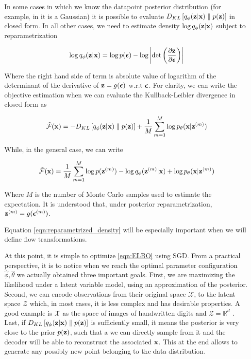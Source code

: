 \documentclass[12pt]{article}
\begin{document}
In some cases in which we know the datapoint posterior distribution (for example, in \cite{kingma2022autoencoding} it is a Gaussian) it is possible to evaluate \(D_{KL}\left[ q_{\phi}(\textbf{z}|\textbf{x}) \parallel p(\textbf{z}) \right]\) in closed form. In all other cases, we need to estimate density \(\log q_\phi (\textbf{z}|\textbf{x})\) subject to reparametrization

\begin{equation}
    \label{eqn:reparametrized_density}
    \log q_\phi (\textbf{z}|\textbf{x}) = \log p(\bm{\epsilon}) - \log \left| \det \left( \frac{\partial\textbf{z}}{\partial\bm{\epsilon}}\right) \right|
\end{equation}

Where the right hand side of term is absolute value of logarithm of the determinant of the derivative of \(\textbf{z}=g(\bm{\epsilon})\) w.r.t \(\bm{\epsilon}\). 
For clarity, we can write the objective estimation when we can evaluate the Kullback-Leibler divergence in closed form as

\begin{equation}
    \label{eqn:ELBO_closed_form}
    \tilde{\mathcal{F}}(\textbf{x}) = -D_{KL}\left[ q_{\phi}(\textbf{z}|\textbf{x}) \parallel p(\textbf{z}) \right] + \frac{1}{M}\sum_{m=1}^M \log p_{\theta}(\textbf{x}|\textbf{z}^{(m)})
\end{equation}

While, in the general case, we can write

\begin{equation}
    \label{eqn:ELBO_general}
    \tilde{\mathcal{F}}(\textbf{x}) = \frac{1}{M}\sum_{m=1}^M \log p(\textbf{z}^{(m)}) - \log q_{\phi}(\textbf{z}^{(m)}|\textbf{x}) + \log p_{\theta}(\textbf{x}|\textbf{z}^{(m)}) 
\end{equation}

Where \(M\) is the number of Monte Carlo samples used to estimate the expectation. It is understood that, under posterior reparametrization, \(\textbf{z}^{(m)} = g(\bm{\epsilon}^{(m)})\).


Equation \eqref{eqn:reparametrized_density} will be especially important when we will define flow transformations. 


At this point, it is simple to optimize \eqref{eqn:ELBO} using SGD. From a practical perspective, it is to notice when we reach the optimal parameter configuration \(\hat{\phi}, \hat{\theta}\) we actually obtained three important goals. First, we are maximizing the likelihood under a latent variable model, using an approximation of the posterior. Second, we can encode observations from their original space \(\mathcal{X}\), to the latent space \(\mathcal{Z}\) which, in most cases, it is less complex and has desirable properties. A good example is \(\mathcal{X}\) as the space of images of handwritten digits and \(\mathcal{Z} = \mathbb{R}^d\) \cite{kingma2022autoencoding}. Last, if \(D_{KL}\left[ q_{\phi}(\textbf{z}|\textbf{x}) \parallel p(\textbf{z}) \right]\) is sufficiently small, it means the posterior is very close to the prior \(p(\textbf{z})\), such that a we can directly sample from it and the decoder will be able to reconstruct the associated \(\textbf{x}\). This at the end allows to generate any possibly new point belonging to the data distribution. 
\end{document}

